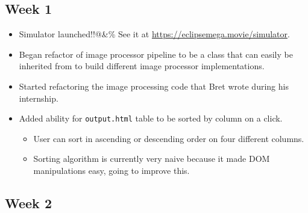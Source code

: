 \documentclass[10pt, onecolumn, draftclsnofoot, letterpaper, compsoc]{IEEEtran}
\begin{document}
\subsection{Week 1}

    \begin{itemize}

	\item Simulator launched!!@\&\% See it at \href{https://eclipsemega.movie/simulator}{https://eclipsemega.movie/simulator}.

	\item Began refactor of image processor pipeline to be a class that can easily be inherited from to build different image processor implementations.

	\item Started refactoring the image processing code that Bret wrote during his internship.

	\item Added ability for \texttt{output.html} table to be sorted by column on a click.
		\begin{itemize}
			\item User can sort in ascending or descending order on four different columns.
			\item Sorting algorithm is currently very naive because it made DOM manipulations easy, going to improve this.
		\end{itemize}

    \end{itemize}

\subsection{Week 2}
\end{document}
